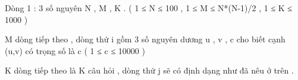 Dòng 1 : 3 số nguyên N , M , K . ( 1 ≤ N ≤ 100 , 1 ≤ M ≤ N*(N-1)/2  , 1 ≤ K ≤ 1000 )   


   M dòng tiếp theo , dòng thứ i gồm 3 số nguyên dương u , v , c cho biết cạnh (u,v) có trọng số là c ( 1 ≤ c ≤ 10000 )   


   K dòng tiếp theo là K câu hỏi , dòng thứ j sẽ có định dạng như đã nêu ở trên .